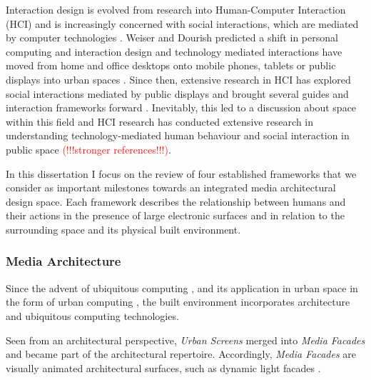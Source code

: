 Interaction design is evolved from research into Human-Computer Interaction (HCI) and is increasingly concerned with social interactions, which are mediated by computer technologies \cite{Hornecker_2006}. 
Weiser \cite{Weiser_1991} and Dourish \cite{Dourish_2004} predicted a shift in personal computing and interaction design and technology mediated interactions have moved from home and office desktops onto mobile phones, tablets or public displays into urban spaces \cite{Rogers_2011}. 
Since then, extensive research in HCI has explored social interactions mediated by public displays and brought several guides \cite{Muller_2010} and interaction frameworks forward \cite{Vogel_2004}. 
Inevitably, this led to a discussion about space within this field and HCI research has conducted extensive research in understanding technology-mediated human behaviour and social interaction in public space \cite{Fischer_2012, Akpan_2013} \textcolor{red}{(!!!stronger references!!!)}.

In this dissertation I focus on the review of four established frameworks \cite{Brignull_2003, Reeves_2011, Michelis_2011, Fischer_2012} that we consider as important milestones towards an integrated media architectural design space. Each framework describes the relationship between humans and their actions in the presence of large electronic surfaces and in relation to the surrounding space and its physical built environment. 


\subsubsection*{Media Architecture}

Since the advent of ubiquitous computing \cite{Weiser_1991}, and its application in urban space in the form of urban computing \cite{Kindberg_2007}, the built environment incorporates architecture and ubiquitous computing technologies.

Seen from an architectural perspective, \textit{Urban Screens} merged into \textit{Media Facades} and became part of the architectural repertoire. Accordingly, \textit{Media Facades} are visually animated architectural surfaces, such as dynamic light facades \cite{Virilio_1991, Fatah_2006, McQuire_2009}.



